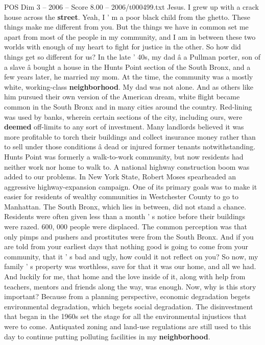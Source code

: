 \begin{textsample}{POS Dim 3 – 2006 – Score 8.00 – 2006/t000499.txt}
Jesus.
I grew up with a crack house across the \textbf{street}.
Yeah, I ' m a poor black child from the ghetto.
These things make me different from you.
But the things we have in common set me apart from most of the people in my community, and I am in between these two worlds with enough of my heart to fight for justice in the other.
So how did things get so different for us?
In the late ' 40s, my dad â a Pullman porter, son of a slave â bought a house in the Hunts Point section of the South Bronx, and a few years later, he married my mom.
At the time, the community was a mostly white, working-class \textbf{neighborhood}.
My dad was not alone.
And as others like him pursued their own version of the American dream, white flight became common in the South Bronx and in many cities around the country.
Red-lining was used by banks, wherein certain sections of the city, including ours, were \textbf{deemed} off-limits to any sort of investment.
Many landlords believed it was more profitable to torch their buildings and collect insurance money rather than to sell under those conditions â dead or injured former tenants notwithstanding.
Hunts Point was formerly a walk-to-work community, but now residents had neither work nor home to walk to.
A national highway construction boom was added to our problems.
In New York State, Robert Moses spearheaded an aggressive highway-expansion campaign.
One of its primary goals was to make it easier for residents of wealthy communities in Westchester County to go to Manhattan.
The South Bronx, which lies in between, did not stand a chance.
Residents were often given less than a month ' s notice before their buildings were razed. 600, 000 people were displaced.
The common perception was that only pimps and pushers and prostitutes were from the South Bronx.
And if you are told from your earliest days that nothing good is going to come from your community, that it ' s bad and ugly, how could it not reflect on you?
So now, my family ' s property was worthless, save for that it was our home, and all we had.
And luckily for me, that home and the love inside of it, along with help from teachers, mentors and friends along the way, was enough.
Now, why is this story important?
Because from a planning perspective, economic degradation begets environmental degradation, which begets social degradation.
The disinvestment that began in the 1960s set the stage for all the environmental injustices that were to come.
Antiquated zoning and land-use regulations are still used to this day to continue putting polluting facilities in my \textbf{neighborhood}.

\end{textsample}
